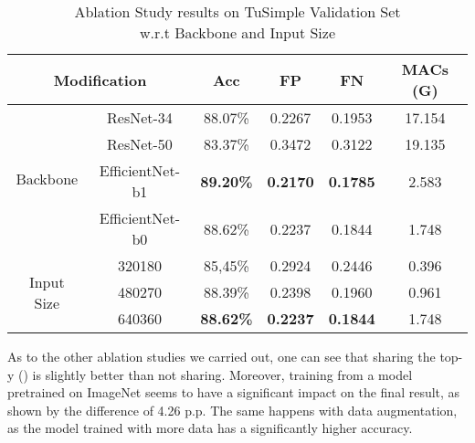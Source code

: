 \documentclass[a4paper,conference]{IEEEtran}
\begin{document}
\begin{table}[h]
	\centering
	\caption{Ablation Study results on TuSimple Validation Set\protect\\ w.r.t Backbone and Input Size}
	\label{tab:ablation-study-backbone-inputsize}
	\begin{tabular}{@{}ccccc|c@{}}
		\toprule
		\multicolumn{2}{c}{\textbf{Modification}}      & \textbf{Acc}      & \textbf{FP}     & \textbf{FN}     & \textbf{MACs (G)} \\ \midrule
		\multirow{4}{*}{Backbone}    & ResNet-34       & 88.07\%           & 0.2267          & 0.1953          & 17.154            \\
		                             & ResNet-50       & 83.37\%           & 0.3472          & 0.3122          & 19.135            \\
		                             & EfficientNet-b1 & \textbf{89.20\%}  & \textbf{0.2170} & \textbf{0.1785} & 2.583            \\
		                             & EfficientNet-b0 & 88.62\%           & 0.2237          & 0.1844          & 1.748            \\ \midrule
		\multirow{3}{*}{Input Size}  & 320180  & 85,45\%           & 0.2924          & 0.2446          & 0.396            \\
		                             & 480270  & 88.39\%           & 0.2398          & 0.1960          & 0.961            \\
		                             & 640360  & \textbf{88.62\%}  & \textbf{0.2237} & \textbf{0.1844} & 1.748            \\ \bottomrule
	\end{tabular}
\end{table} 
As to the other ablation studies we carried out, one can see that sharing the top-y () is slightly better than not sharing. Moreover, training from a model pretrained on ImageNet seems to have a significant impact on the final result, as shown by the difference of 4.26 p.p. The same happens with data augmentation, as the model trained with more data has a significantly higher accuracy.
\end{document}
